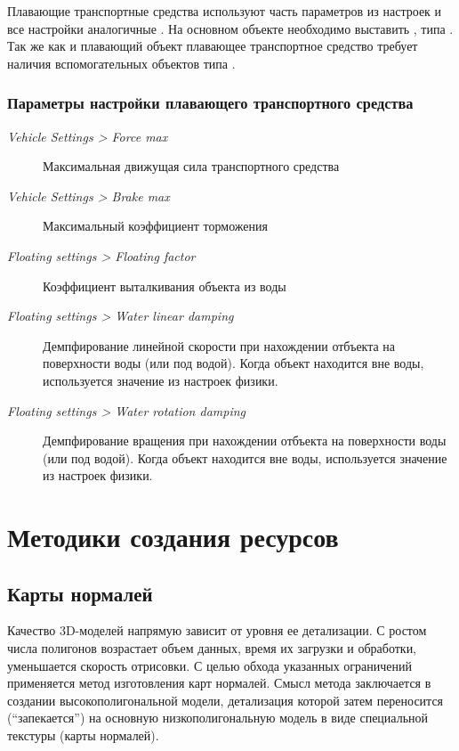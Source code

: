 \documentclass[a4paper,12pt,oneside]{sphinxmanual}
\begin{document}
Плавающие транспортные средства используют часть параметров из настроек  и все настройки аналогичные . На основном объекте необходимо выставить , типа . Так же как и плавающий объект плавающее транспортное средство требует наличия вспомогательных объектов типа .


\subsection{Параметры настройки плавающего транспортного средства}
\label{physics:id10}\begin{description}
\item[{\emph{Vehicle Settings \textgreater{} Force max}}] \leavevmode
Максимальная движущая сила транспортного средства

\item[{\emph{Vehicle Settings \textgreater{} Brake max}}] \leavevmode
Максимальный коэффициент торможения

\item[{\emph{Floating settings \textgreater{} Floating factor}}] \leavevmode
Коэффициент выталкивания объекта из воды

\item[{\emph{Floating settings \textgreater{} Water linear damping}}] \leavevmode
Демпфирование линейной скорости при нахождении отбъекта на поверхности воды (или под водой). Когда объект находится вне воды, используется значение из настроек физики.

\item[{\emph{Floating settings \textgreater{} Water rotation damping}}] \leavevmode
Демпфирование вращения при нахождении отбъекта на поверхности воды (или под водой). Когда объект находится вне воды, используется значение из настроек физики.

\end{description}


\chapter{Методики создания ресурсов}
\label{assets_creation::doc}\label{assets_creation:id1}

\section{Карты нормалей}
\label{assets_creation:normal-mapping}\label{assets_creation:id2}
Качество 3D-моделей напрямую зависит от уровня ее детализации. С ростом числа полигонов возрастает объем данных, время их загрузки и обработки, уменьшается скорость отрисовки. С целью обхода указанных ограничений применяется метод изготовления карт нормалей. Смысл метода заключается в создании высокополигональной модели, детализация которой затем переносится (``запекается'') на основную низкополигональную модель в виде специальной текстуры (карты нормалей).
\end{document}
